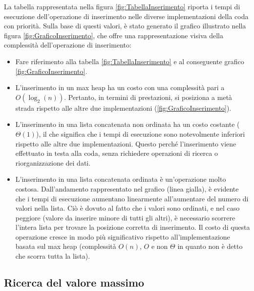 \documentclass{article}
\begin{document}
La tabella rappresentata nella figura \ref{fig:TabellaInserimento} riporta i tempi di esecuzione dell'operazione di inserimento nelle diverse implementazioni della coda con priorità. Sulla base di questi valori, è stato generato il grafico illustrato nella figura \ref{fig:GraficoInserimento}, che offre una rappresentazione visiva della complessità dell'operazione di inserimento:

\begin{itemize}
\item Fare riferimento alla tabella \ref{fig:TabellaInserimento} e al conseguente grafico \ref{fig:GraficoInserimento}.

\item L'inserimento in un max heap ha un costo con una complessità pari a $O(\log_2(n))$. Pertanto, in termini di prestazioni, si posiziona a metà strada rispetto alle altre due implementazioni (\ref{fig:GraficoInserimento}).

\item L'inserimento in una lista concatenata non ordinata ha un costo costante ($\Theta(1)$), il che significa che i tempi di esecuzione sono notevolmente inferiori rispetto alle altre due implementazioni. Questo perché l'inserimento viene effettuato in testa alla coda, senza richiedere operazioni di ricerca o riorganizzazione dei dati.

\item L'inserimento in una lista concatenata ordinata è un'operazione molto costosa. Dall'andamento rappresentato nel grafico (linea gialla), è evidente che i tempi di esecuzione aumentano linearmente all'aumentare del numero di valori nella lista. Ciò è dovuto al fatto che i valori sono ordinati, e nel caso peggiore (valore da inserire minore di tutti gli altri), è necessario scorrere l'intera lista per trovare la posizione corretta di inserimento. Il costo di questa operazione cresce in modo più significativo rispetto all'implementazione basata sul max heap (complessità $O(n)$, $O$ e non $\Theta$ in quanto non è detto che scorra tutta la lista).

\end{itemize}

\subsection{Ricerca del valore massimo}
\end{document}
